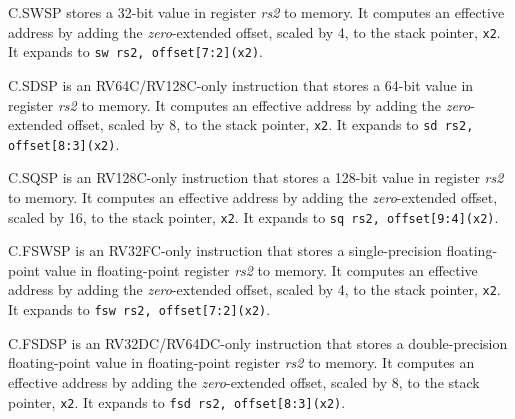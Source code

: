 C.SWSP stores a 32-bit value in register {\em rs2} to memory.  It computes
an effective address by adding the {\em zero}-extended offset, scaled by 4, to
the stack pointer, {\tt x2}.
It expands to {\tt sw rs2, offset[7:2](x2)}.

C.SDSP is an RV64C/RV128C-only instruction that stores a 64-bit value in register
{\em rs2} to memory.  It computes an effective address by adding the {\em
zero}-extended offset, scaled by 8, to the stack pointer, {\tt x2}.
It expands to {\tt sd rs2, offset[8:3](x2)}.

C.SQSP is an RV128C-only instruction that stores a 128-bit value in register
{\em rs2} to memory.  It computes an effective address by adding the {\em
zero}-extended offset, scaled by 16, to the stack pointer, {\tt x2}.
It expands to {\tt sq rs2, offset[9:4](x2)}.

C.FSWSP is an RV32FC-only instruction that stores a single-precision
floating-point value in floating-point register {\em rs2} to memory.  It
computes an effective address by adding the {\em zero}-extended offset, scaled
by 4, to the stack pointer, {\tt x2}.  It expands to {\tt fsw rs2,
offset[7:2](x2)}.

C.FSDSP is an RV32DC/RV64DC-only instruction that stores a double-precision
floating-point value in floating-point register {\em rs2} to memory.  It
computes an effective address by adding the {\em zero}-extended offset, scaled
by 8, to the stack pointer, {\tt x2}.  It expands to {\tt fsd rs2,
offset[8:3](x2)}.

